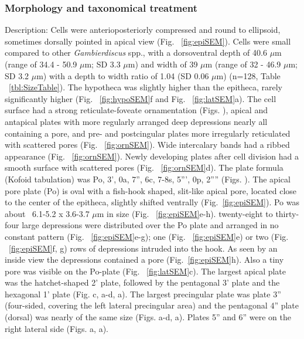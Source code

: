 \documentclass[12pt]{article}
\begin{document}
\subsubsection{Morphology and taxonomical treatment}
Description: Cells were anterioposteriorly compressed and round to ellipsoid, sometimes dorsally pointed in apical view (Fig. ~\ref{fig:epiSEM}). 
Cells were small compared to other \textit{Gambierdiscus} spp., with a dorsoventral depth of 40.6 $\mu$m (range of 34.4 - 50.9 $\mu$m; SD 3.3 $\mu$m) and width of 39 $\mu$m (range of 32 - 46.9 $\mu$m; SD 3.2 $\mu$m) with a depth to width ratio of 1.04 (SD 0.06 $\mu$m) (n=128, Table ~\ref{tbl:SizeTable}). 
The hypotheca was slightly higher than the epitheca, rarely significantly higher (Fig. ~\ref{fig:hypoSEM}f and Fig. ~\ref{fig:latSEM}a).
The cell surface had a strong  reticulate-foveate ornamentation (Figs. %
), apical and antapical plates with more regularly arranged deep depressions nearly all containing a pore, and pre- and postcingular plates more irregularly reticulated with scattered pores (Fig. ~\ref{fig:ornSEM}). 
Wide intercalary bands had a ribbed appearance (Fig. ~\ref{fig:ornSEM}). 
Newly developing plates after cell division had a smooth surface with scattered pores (Fig. ~\ref{fig:ornSEM}d). 
The plate formula (Kofoid tabulation) was Po, 3', 0a, 7'', 6c, 7-8s, 5''', 0p, 2'''' (Figs. ). %
The apical pore plate (Po) is oval with a fish-hook shaped, slit-like apical pore, located close to the center of the epitheca, slightly shifted ventrally (Fig.~\ref{fig:epiSEM}). 
Po was about ~6.1-5.2 x 3.6-3.7 $\mu$m in size (Fig. ~\ref{fig:epiSEM}e-h). 
twenty-eight to thirty-four large depressions were distributed over the Po plate and arranged in no constant pattern (Fig. ~\ref{fig:epiSEM}e-g); one (Fig. ~\ref{fig:epiSEM}e) or two (Fig. ~\ref{fig:epiSEM}f, g) rows of depressions intruded into the hook. 
As seen by an inside view the depressions contained a pore (Fig.~\ref{fig:epiSEM}h). 
Also a tiny pore was visible on the Po-plate (Fig. ~\ref{fig:latSEM}c). 
The largest apical plate was the hatchet-shaped 2' plate, followed by the pentagonal 3' plate and the hexagonal 1' plate (Fig. c, a-d, a). %
The largest precingular plate was plate 3'' (four-sided, covering the left lateral precingular area) and the pentagonal 4'' plate (dorsal) was nearly of the same size (Figs. a-d, a). %
Plates 5'' and 6'' were on the right lateral side (Figs. a, a). %
\end{document}
